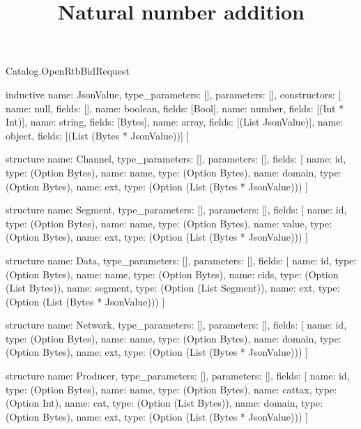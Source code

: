 \begin{lexlean}{Catalog.OpenRtbBidRequest}
\title{Natural number addition}
\begin{semanticmodule}
inductive{
  name: JsonValue,
  type_parameters: [],
  parameters: [],
  constructors: [
    {name: null, fields: []},
    {name: boolean, fields: [Bool]},
    {name: number, fields: [(Int * Int)]},
    {name: string, fields: [Bytes]},
    {name: array, fields: [(List JsonValue)]},
    {name: object, fields: [(List (Bytes * JsonValue))]}
  ]
}

structure{
  name: Channel,
  type_parameters: [],
  parameters: [],
  fields: [
    {name: id, type: (Option Bytes)},
    {name: name, type: (Option Bytes)},
    {name: domain, type: (Option Bytes)},
    {name: ext, type: (Option (List (Bytes * JsonValue)))}
  ]
}

structure{
  name: Segment,
  type_parameters: [],
  parameters: [],
  fields: [
    {name: id, type: (Option Bytes)},
    {name: name, type: (Option Bytes)},
    {name: value, type: (Option Bytes)},
    {name: ext, type: (Option (List (Bytes * JsonValue)))}
  ]
}

structure{
  name: Data,
  type_parameters: [],
  parameters: [],
  fields: [
    {name: id, type: (Option Bytes)},
    {name: name, type: (Option Bytes)},
    {name: cids, type: (Option (List Bytes))},
    {name: segment, type: (Option (List Segment))},
    {name: ext, type: (Option (List (Bytes * JsonValue)))}
  ]
}

structure{
  name: Network,
  type_parameters: [],
  parameters: [],
  fields: [
    {name: id, type: (Option Bytes)},
    {name: name, type: (Option Bytes)},
    {name: domain, type: (Option Bytes)},
    {name: ext, type: (Option (List (Bytes * JsonValue)))}
  ]
}

structure{
  name: Producer,
  type_parameters: [],
  parameters: [],
  fields: [
    {name: id, type: (Option Bytes)},
    {name: name, type: (Option Bytes)},
    {name: cattax, type: (Option Int)},
    {name: cat, type: (Option (List Bytes))},
    {name: domain, type: (Option Bytes)},
    {name: ext, type: (Option (List (Bytes * JsonValue)))}
  ]
}


\end{semanticmodule}
\end{lexlean}
